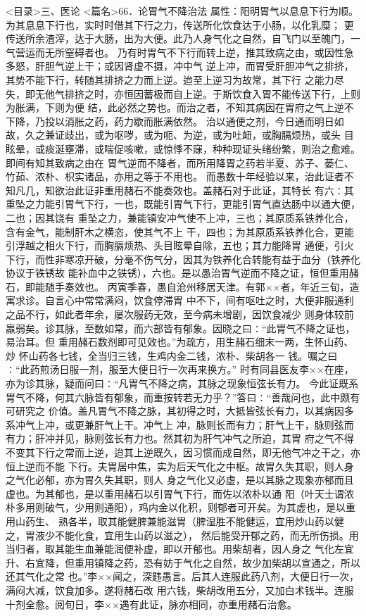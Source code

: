 \documentclass[a4paper,12pt,UTF8,twoside]{ctexbook}
\begin{document}
<目录>三、医论
<篇名>66．论胃气不降治法
属性：阳明胃气以息息下行为顺。为其息息下行也，实时时借其下行之力，传送所化饮食达于小肠，以化乳糜； 
更传送所余渣滓，达于大肠，出为大便。此乃人身气化之自然，自飞门以至魄门，一气营运而无所窒碍者也。 
乃有时胃气不下行而转上逆，推其致病之由，或因性急多怒，肝胆气逆上干；或因肾虚不摄，冲中气 
逆上冲，而胃受肝胆冲气之排挤，其势不能下行，转随其排挤之力而上逆。迨至上逆习为故常，其下行 
之能力尽失，即无他气排挤之时，亦恒因蓄极而自上逆。于斯饮食入胃不能传送下行，上则为胀满，下则为便 
结，此必然之势也。而治之者，不知其病因在胃府之气上逆不下降，乃投以消胀之药，药力歇而胀满依然。 
治以通便之剂，今日通而明日如故，久之兼证歧出，或为呕哕，或为呃、为逆，或为吐衄，或胸膈烦热，或头 
目眩晕，或痰涎壅滞，或喘促咳嗽，或惊悸不寐，种种现证头绪纷繁，则治之愈难。即间有知其致病之由在 
胃气逆而不降者，而所用降胃之药若半夏、苏子、蒌仁、竹茹、浓朴、枳实诸品，亦用之等于不用也。 
而愚数十年经验以来，治此证者不知凡几，知欲治此证非重用赭石不能奏效也。盖赭石对于此证，其特长 
有六∶其重坠之力能引胃气下行，一也，既能引胃气下行，更能引胃气直达肠中以通大便，二也；因其饶有 
重坠之力，兼能镇安冲气使不上冲，三也；其原质系铁养化合，含有金气，能制肝木之横恣，使其气不上 
干，四也；为其原质系铁养化合，更能引浮越之相火下行，而胸膈烦热、头目眩晕自除，五也；其力能降胃 
通便，引火下行，而性非寒凉开破，分毫不伤气分，因其为铁养化合转能有益于血分（铁养化协议于铁锈故 
能补血中之铁锈），六也。是以愚治胃气逆而不降之证，恒但重用赭石，即能随手奏效也。 
丙寅季春，愚自沧州移居天津。有郭××者，年近三旬，造寓求诊。自言心中常常满闷，饮食停滞胃 
中不下，间有呕吐之时，大便非服通利之品不行，如此者年余，屡次服药无效，至今病未增剧，因饮食减少 
则身体较前羸弱矣。诊其脉，至数如常，而六部皆有郁象。因晓之曰∶“此胃气不降之证也，易治耳。但 
重用赭石数剂即可见效也。”为疏方，用生赭石细末一两，生怀山药、炒 
怀山药各七钱，全当归三钱，生鸡内金二钱，浓朴、柴胡各一 
钱。嘱之曰∶“此药煎汤日服一剂，服至大便日行一次再来换方。” 
时有同县医友李××在座，亦为诊其脉，疑而问曰∶“凡胃气不降之病，其脉之现象恒弦长有力。 
今此证既系胃气不降，何其六脉皆有郁象，而重按转若无力乎？”答曰∶“善哉问也，此中颇有可研究之 
价值。盖凡胃气不降之脉，其初得之时，大抵皆弦长有力，以其病因多系冲气上冲，或更兼肝气上干。冲气上 
冲，脉则长而有力；肝气上干，脉则弦而有力；肝冲并见，脉则弦长有力也。然其初为肝气冲气之所迫，其胃 
府之气不得不变其下行之常而上逆，迨其上逆既久，因习惯而成自然，即无他气冲之干之，亦恒上逆而不能 
下行。夫胃居中焦，实为后天气化之中枢。故胃久失其职，则人身之气化必郁，亦为胃久失其职，则人 
身之气化又必虚，是以其脉之现象亦郁而且虚也。为其郁也，是以重用赭石以引胃气下行，而佐以浓朴以通 
阳（叶天士谓浓朴多用则破气，少用则通阳），鸡内金以化积，则郁者可开矣。为其虚也，是以重用山药生、 
熟各半，取其能健脾兼能滋胃（脾湿胜不能健运，宜用炒山药以健之，胃液少不能化食，宜用生山药以滋之）， 
然后能受开郁之药，而无所伤损。用当归者，取其能生血兼能润便补虚，即以开郁也。用柴胡者，因人身之 
气化左宜升、右宜降，但重用镇降之药，恐有妨于气化之自然，故少加柴胡以宣通之，所以还其气化之常 
也。”李××闻之，深韪愚言。后其人连服此药八剂，大便日行一次，满闷大减，饮食加多。遂将赭石改 
用六钱，柴胡改用五分，又加白术钱半。连服十剂全愈。阅旬日，李××遇有此证，脉亦相同，亦重用赭石治愈。 
\end{document}
